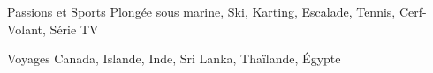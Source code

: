 

\begin{cvskills}

	\cvskill
		{Passions et Sports} %
		{Plongée sous marine, Ski, Karting, Escalade, Tennis, Cerf-Volant, Série TV} %

	\cvskill
		{Voyages} %
		{Canada, Islande, Inde, Sri Lanka, Thaïlande, Égypte} %


\end{cvskills}
